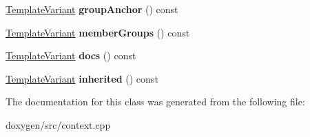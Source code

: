 \begin{DoxyCompactItemize}
\mbox{\hyperlink{class_template_variant}{Template\+Variant}} {\bfseries group\+Anchor} () const
\item 
\mbox{\label{class_member_group_info_context_1_1_private_a6be8a30dbbd24c08ca4c4c8e5630116d}} 
\mbox{\hyperlink{class_template_variant}{Template\+Variant}} {\bfseries member\+Groups} () const
\item 
\mbox{\label{class_member_group_info_context_1_1_private_af2b2f5ac4f46c8cf685d038abbaaffa4}} 
\mbox{\hyperlink{class_template_variant}{Template\+Variant}} {\bfseries docs} () const
\item 
\mbox{\label{class_member_group_info_context_1_1_private_af5c503b24d9fb25cf4644191922bf516}} 
\mbox{\hyperlink{class_template_variant}{Template\+Variant}} {\bfseries inherited} () const
\end{DoxyCompactItemize}


The documentation for this class was generated from the following file\+:\begin{DoxyCompactItemize}
\item 
doxygen/src/context.\+cpp\end{DoxyCompactItemize}
